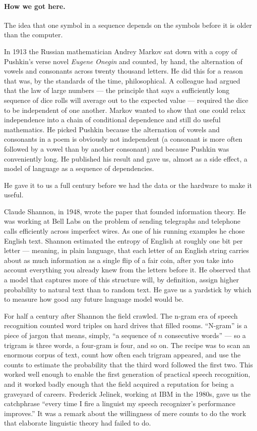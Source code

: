 \paragraph{How we got here.} The idea that one symbol in a sequence depends on the symbols
before it is older than the computer.

In 1913 the Russian mathematician Andrey Markov sat down with a
copy of Pushkin's verse novel \emph{Eugene Onegin} and counted,
by hand, the alternation of vowels and consonants across twenty
thousand letters. He did this for a reason that was, by the
standards of the time, philosophical. A colleague had argued
that the law of large numbers --- the principle that says a
sufficiently long sequence of dice rolls will average out to the
expected value --- required the dice to be independent of one
another. Markov wanted to show that one could relax independence
into a chain of conditional dependence and still do useful
mathematics. He picked Pushkin because the alternation of vowels
and consonants in a poem is obviously not independent (a
consonant is more often followed by a vowel than by another
consonant) and because Pushkin was conveniently long. He
published his result and gave us, almost as a side effect, a
model of language as a sequence of dependencies.

He gave it to us a full century before we had the data or the
hardware to make it useful.

Claude Shannon, in 1948, wrote the paper that founded
information theory. He was working at Bell Labs on the problem of
sending telegraphs and telephone calls efficiently across
imperfect wires. As one of his running examples he chose English
text. Shannon estimated the entropy of English at roughly one bit
per letter --- meaning, in plain language, that each letter of an
English string carries about as much information as a single
flip of a fair coin, after you take into account everything you
already knew from the letters before it. He observed that a model
that captures more of this structure will, by definition, assign
higher probability to natural text than to random text. He gave
us a yardstick by which to measure how good any future language
model would be.

For half a century after Shannon the field crawled. The n-gram
era of speech recognition counted word triples on hard drives
that filled rooms. ``N-gram'' is a piece of jargon that means,
simply, ``a sequence of $n$ consecutive words'' --- so a
trigram is three words, a four-gram is four, and so on. The
recipe was to scan an enormous corpus of text, count how often
each trigram appeared, and use the counts to estimate the
probability that the third word followed the first two. This
worked well enough to enable the first generation of practical
speech recognition, and it worked badly enough that the field
acquired a reputation for being a graveyard of careers. Frederick
Jelinek, working at IBM in the 1980s, gave us the catchphrase
``every time I fire a linguist my speech recognizer's performance
improves.'' It was a remark about the willingness of mere counts
to do the work that elaborate linguistic theory had failed to do.


